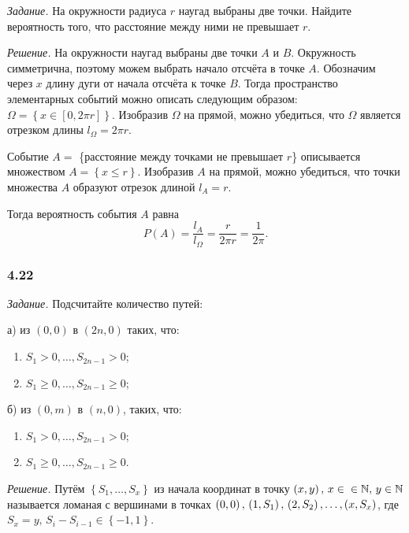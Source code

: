 \documentclass{book}
\begin{document}
\textit{Задание.} На окружности радиуса $r$ наугад выбраны две точки.
Найдите вероятность того, что расстояние между ними не превышает $r$.

\textit{Решение.} На окружности наугад выбраны две точки $A$ и $B$.
Окружность симметрична, поэтому можем выбрать начало отсчёта в точке $A$.
Обозначим через $x$ длину дуги от начала отсчёта к точке $B$.
Тогда пространство элементарных событий можно описать следующим образом:
$ \Omega =
\left\{ x \in \left[ 0, 2 \pi r \right] \right\} $.
Изобразив $ \Omega $ на прямой, можно убедиться, что $ \Omega $ является отрезком длины $l_{ \Omega } = 2 \pi r$.

Событие $A = $ \{расстояние между точками не превышает $r$\} описывается множеством $A = \left\{ x \leq r \right\} $.
Изобразив $A$ на прямой, можно убедиться, что точки множества $A$ образуют отрезок длиной $l_A = r$.

Тогда вероятность события $A$ равна
$$P \left( A \right) =
\frac{l_A}{l_{ \Omega }} =
\frac{r}{2 \pi r} =
\frac{1}{2 \pi}.$$

\subsubsection*{4.22}

\textit{Задание.} Подсчитайте количество путей:

а) из $ \left( 0, 0 \right) $ в $ \left( 2n, 0 \right) $ таких, что:
\begin{enumerate}[label=(\roman*)]
\item $S_1 > 0, \dotsc, S_{2n-1} > 0$;
\item $S_1 \geq 0, \dotsc, S_{2n-1} \geq 0$;
\end{enumerate}

б) из $ \left( 0, m \right) $ в $ \left( n, 0 \right) $, таких, что:
\begin{enumerate}[label=(\roman*)]
\item $S_1 > 0, \dotsc, S_{2n-1} > 0$;
\item $S_1 \geq 0, \dotsc, S_{2n-1} \geq 0$.
\end{enumerate}

\textit{Решение.} Путём $ \left\{ S_1, \dotsc, S_x \right\} $ из начала координат в точку
$ \left( x, y \right), \, x \in \\ \in \mathbb{N}, \, y \in \mathbb{N} $
называется ломаная с вершинами в точках
$ \left( 0, 0 \right), \, \left( 1, S_1 \right), \\ \left( 2, S_2 \right), \dotsc, \left( x, S_x \right) $, где $S_x = y, \, S_i - S_{i-1} \in \left\{ -1, 1 \right\} .$
\end{document}
